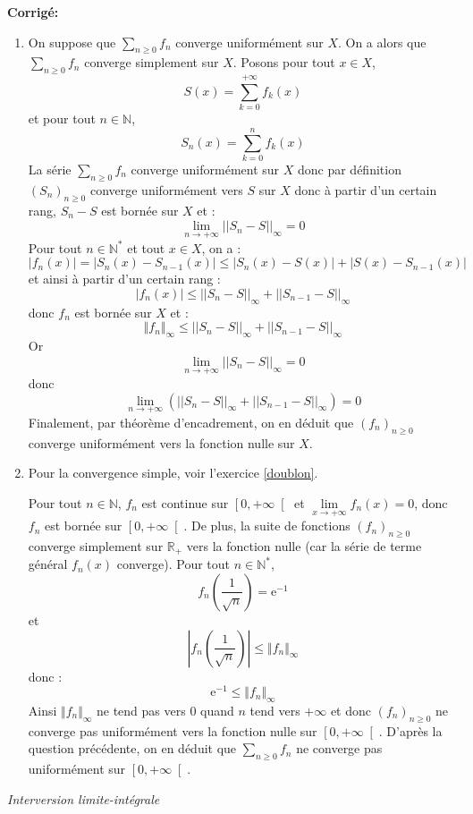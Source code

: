 \documentclass[a4paper,twoside,french,11pt]{VcCours}
\newcommand{\Sum}[2]{\sum_{#1}^{#2}}
\newcommand{\corr}{\textbf{Corrigé:}}
\begin{document}
\corr 
\begin{enumerate}
\item On suppose que $\Sum{n\geq 0}{} f_n$ converge uniformément sur $X$. On a alors que $\Sum{n\geq 0}{} f_n$ converge simplement sur $X$. Posons pour tout $x \in X$,
$$S(x)=\sum\limits_{k=0}^{+\infty}f_k(x)$$
et pour tout $n\in\mathbb{N}$, 
$$S_n(x)=\sum\limits_{k=0}^{n}f_k(x)$$
La série $\Sum{n\geq 0}{} f_n$ converge uniformément sur $X$ donc par définition $(S_n)_{n \geq 0}$ converge uniformément vers $S$ sur $X$ donc à partir d'un certain rang, $S_n-S$ est bornée sur $X$ et :
$$\lim\limits_{n\to+\infty}^{}||S_n-S||_{\infty}=0$$ 
Pour tout $n \in \mathbb{N}^*$ et tout $x \in X$, on a :
$$|f_n(x)|=|S_n(x)-S_{n-1}(x)|\leq |S_n(x)-S(x)|+|S(x)-S_{n-1}(x)|$$
et ainsi à partir d'un certain rang :
$$|f_n(x)|\leq ||S_n-S||_{\infty} +||S_{n-1}-S||_{\infty} $$ 
donc $f_n$ est bornée sur $X$ et : 
$$ \Vert f_n \Vert_{\infty} \leq ||S_n-S||_{\infty} +||S_{n-1}-S||_{\infty} $$ 
Or  
$$\lim\limits_{n\to+\infty}^{}||S_n-S||_{\infty}=0$$ 
donc   
$$\lim\limits_{n\to+\infty}^{}\left( ||S_n-S||_{\infty}+||S_{n-1}-S||_{\infty}\right) =0$$
Finalement, par théorème d'encadrement, on en déduit que  $(f_n)_{n \geq 0}$ converge uniformément vers la fonction nulle sur $X$.
\item Pour la convergence simple, voir l'exercice \ref{doublon}.

\medskip

Pour tout $n\in\mathbb{N}$, $f_n$ est continue sur  $\left[0,+\infty \right[$ et  $\lim\limits_{x\to +\infty}^{}f_n(x)=0$, donc $f_n$ est bornée sur $\left[0,+\infty \right[$. De plus, la suite de fonctions $(f_n)_{n \geq 0}$ converge simplement sur $\mathbb{R}_+$ vers la fonction nulle (car la série de terme général $f_n(x)$ converge). Pour tout $n\in\mathbb{N}^*$, 
$$f_n\left( \dfrac{1}{\sqrt{n}}\right) =\mathrm{e}^{-1}$$
et
$$\left\vert f_n\left( \dfrac{1}{\sqrt{n}}\right) \right\vert \leq \Vert f_n \Vert_{\infty}$$
donc :
$$ \mathrm{e}^{-1} \leq \Vert f_n \Vert_{\infty}$$
Ainsi $\Vert f_n \Vert_{\infty}$ ne tend pas vers $0$ quand $n$ tend vers $+ \infty$ et donc $(f_n)_{n \geq 0}$ ne converge pas uniformément vers la fonction nulle sur $\left[0,+\infty \right[$. D'après la question précédente, on en déduit que $\Sum{n\geq 0}{} f_n$ ne converge pas uniformément sur $\left[0,+\infty \right[$.
\end{enumerate}


\medskip

\begin{center}
\textit{{ {\large Interversion limite-intégrale}}}
\end{center}
\end{document}
